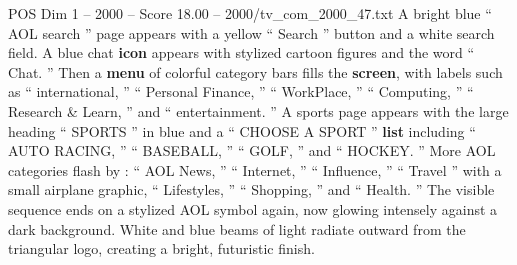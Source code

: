 \begin{textsample}{POS Dim 1 – 2000 – Score 18.00 – 2000/tv\_com\_2000\_47.txt}
A bright blue “ AOL search ” page appears with a yellow “ Search ” button and a white search field.
A blue chat \textbf{icon} appears with stylized cartoon figures and the word “ Chat. ” Then a \textbf{menu} of colorful category bars fills the \textbf{screen}, with labels such as “ international, ” “ Personal Finance, ” “ WorkPlace, ” “ Computing, ” “ Research \& Learn, ” and “ entertainment. ” A sports page appears with the large heading “ SPORTS ” in blue and a “ CHOOSE A SPORT ” \textbf{list} including “ AUTO RACING, ” “ BASEBALL, ” “ GOLF, ” and “ HOCKEY. ” More AOL categories flash by : “ AOL News, ” “ Internet, ” “ Influence, ” “ Travel ” with a small airplane graphic, “ Lifestyles, ” “ Shopping, ” and “ Health. ” The visible sequence ends on a stylized AOL symbol again, now glowing intensely against a dark background.
White and blue beams of light radiate outward from the triangular logo, creating a bright, futuristic finish.

\end{textsample}
